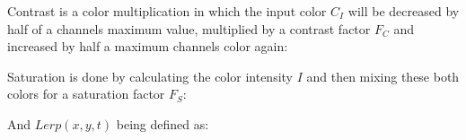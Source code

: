 Contrast is a color multiplication in which the input color $C_I$ will be 
decreased by half of a channels maximum value, multiplied by a contrast factor 
$F_C$ and increased by half a maximum channels color again:


Saturation is done by calculating the color intensity $I$ and then mixing these 
both colors for a saturation factor $F_S$:


And $Lerp(x, y, t)$ being defined as:


